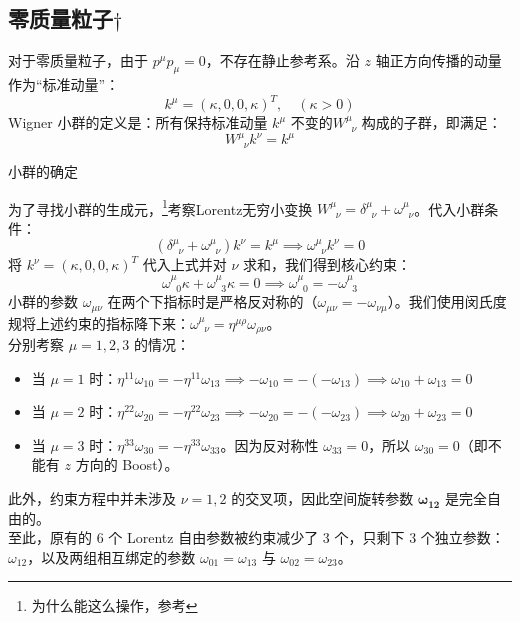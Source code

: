 \subsection{零质量粒子\(\dagger\)}
对于零质量粒子，由于 $p^\mu p_\mu = 0$，不存在静止参考系。沿 $z$ 轴正方向传播的动量作为“标准动量”：
\begin{equation}
    k^\mu = (\kappa, 0, 0, \kappa)^T, \quad (\kappa > 0)
\end{equation}
Wigner 小群的定义是：所有保持标准动量 $k^\mu$ 不变的$W^{\mu}_{\;\;\nu}$ 构成的子群，即满足：
\begin{equation}
    W^{\mu}_{\;\;\nu} k^\nu = k^\mu
\end{equation}
\begin{center}\vspace{2ex}
\large 小群的确定
\vspace{2ex}\end{center}
为了寻找小群的生成元，\footnote{为什么能这么操作，参考}考察Lorentz无穷小变换 $W^{\mu}_{\;\;\nu} = \delta^\mu_{\;\;\nu} + \omega^\mu_{\;\;\nu}$。代入小群条件：
\begin{equation}
    (\delta^\mu_{\;\;\nu} + \omega^\mu_{\;\;\nu}) k^\nu = k^\mu \implies \omega^\mu_{\;\;\nu} k^\nu = 0
\end{equation}
将 $k^\nu = (\kappa, 0, 0, \kappa)^T$ 代入上式并对 $\nu$ 求和，我们得到核心约束：
\begin{equation}
    \omega^\mu_{\;\;0} \kappa + \omega^\mu_{\;\;3} \kappa = 0 \implies \omega^\mu_{\;\;0} = -\omega^\mu_{\;\;3}
\end{equation}
小群的参数 $\omega_{\mu\nu}$ 在两个下指标时是严格反对称的（$\omega_{\mu\nu} = -\omega_{\nu\mu}$）。我们使用闵氏度规将上述约束的指标降下来：$\omega^\mu_{\;\;\nu} = \eta^{\mu\rho}\omega_{\rho\nu}$。
\vspace{2ex}
\\
分别考察 $\mu = 1, 2, 3$ 的情况：
\begin{itemize}
    \item 当 $\mu = 1$ 时：$\eta^{11}\omega_{10} = -\eta^{11}\omega_{13} \implies -\omega_{10} = -(-\omega_{13}) \implies \omega_{10} + \omega_{13} = 0$
    \item 当 $\mu = 2$ 时：$\eta^{22}\omega_{20} = -\eta^{22}\omega_{23} \implies -\omega_{20} = -(-\omega_{23}) \implies \omega_{20} + \omega_{23} = 0$
    \item 当 $\mu = 3$ 时：$\eta^{33}\omega_{30} = -\eta^{33}\omega_{33}$。因为反对称性 $\omega_{33}=0$，所以 $\omega_{30}=0$（即不能有 $z$ 方向的 Boost）。
\end{itemize}
\color{blue}此外，约束方程中并未涉及 $\nu = 1, 2$ 的交叉项，因此空间旋转参数 $\mathbf{\omega_{12}}$ 是完全自由的。\normalcolor
\vspace{2ex}
\\
至此，原有的 6 个 Lorentz 自由参数被约束减少了 3 个，只剩下 3 个独立参数：$\omega_{12}$，以及两组相互绑定的参数 $\omega_{01}=\omega_{13}$ 与 $\omega_{02}=\omega_{23}$。

